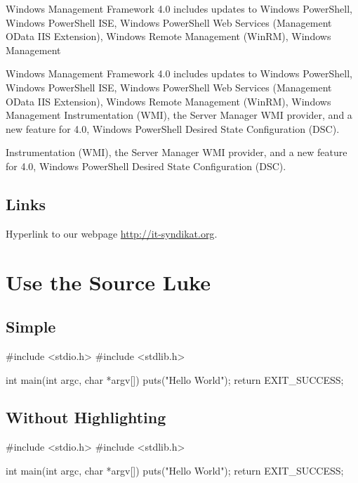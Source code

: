 \documentclass[10pt,a4paper,parskip=half]{scrartcl}
\theoremstyle{plain}
\renewenvironment{quote}
    {\begin{center}\begin{minipage}{0.95\textwidth}\begin{sidequote}}
    {\end{sidequote}\end{minipage}\end{center}}
\begin{document}
\begin{quote}
    Windows Management Framework 4.0 includes updates to Windows PowerShell,
    Windows PowerShell ISE, Windows PowerShell Web Services (Management OData
    IIS Extension), Windows Remote Management (WinRM), Windows Management

    \begin{quote}
        Windows Management Framework 4.0 includes updates to Windows PowerShell,
        Windows PowerShell ISE, Windows PowerShell Web Services (Management OData
        IIS Extension), Windows Remote Management (WinRM), Windows Management
        Instrumentation (WMI), the Server Manager WMI provider, and a new feature
        for 4.0, Windows PowerShell Desired State Configuration (DSC).
    \end{quote}

    Instrumentation (WMI), the Server Manager WMI provider, and a new feature
    for 4.0, Windows PowerShell Desired State Configuration (DSC).
\end{quote}

\subsection{Links}
\label{sub:links}

Hyperlink to our webpage \url{http://it-syndikat.org}.

\newpage

\section{Use the Source Luke}
\label{sec:use_the_source_luke}

\subsection{Simple}
\label{sub:simple}

\begin{ccode}
#include <stdio.h>
#include <stdlib.h>

int main(int argc, char *argv[]) {
    puts("Hello World");
    return EXIT_SUCCESS;
}
\end{ccode}

\subsection{Without Highlighting}
\label{sub:without_highlighting}

\begin{code}
#include <stdio.h>
#include <stdlib.h>

int main(int argc, char *argv[]) {
    puts("Hello World");
    return EXIT_SUCCESS;
}
\end{code}
\end{document}

